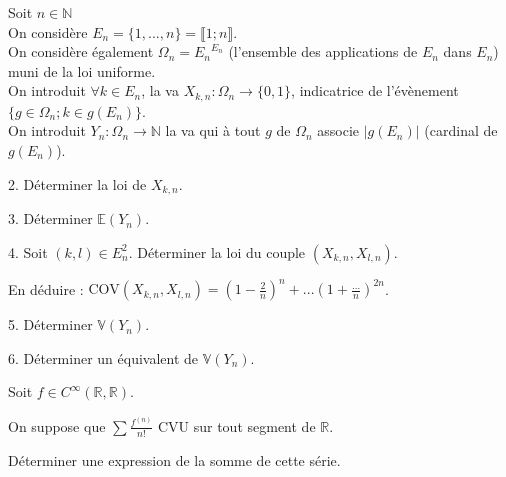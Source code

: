 \vspace{5pt}
\noindent Soit $n \in \mathbb{N}$ \\
\noindent On considère $E_n = \{1, ..., n\} = \llbracket 1;n \rrbracket$. \\
\noindent On considère également $\Omega_n = {E_n}^{E_n}$
(l'ensemble des applications de $E_n$ dans $E_n$) muni de la loi uniforme. \\
\noindent On introduit $\forall k \in E_n$, la va $X_{k,n} : \Omega_n \rightarrow \{0,1\}$,
indicatrice de l'évènement $\{g \in \Omega_n; k \in g(E_n)\}$. \\
\noindent On introduit $Y_n : \Omega_n \rightarrow \mathbb{N}$ la va qui à tout $g$ de $\Omega_n$
associe $|g(E_n)|$ (cardinal de $g(E_n)$).

\vspace{5pt}
2. Déterminer la loi de $X_{k,n}$.

\vspace{5pt}
3. Déterminer $\mathbb{E}(Y_n)$.

\vspace{5pt}
4. Soit $(k,l) \in E_n^2$. Déterminer la loi du couple $(X_{k,n}, X_{l,n})$.

En déduire :
$\textrm{COV}(X_{k,n}, X_{l,n}) = \left( 1 - \frac {2} {n}\right) ^n + ... \left(1 + \frac {...} {n}\right)^{2n}$.

\vspace{5pt}
5. Déterminer $\mathbb{V}(Y_n)$.

\vspace{5pt}
6. Déterminer un équivalent de $\mathbb{V}(Y_n)$.



\subetoiles



\noindent Soit $f \in C^{\infty}(\mathbb{R}, \mathbb{R})$.

\noindent On suppose que $\displaystyle \sum \frac {f^{(n)}} {n!}$ CVU sur tout segment de $\mathbb{R}$.

\noindent Déterminer une expression de la somme de cette série.



\subetoiles
\columnbreak